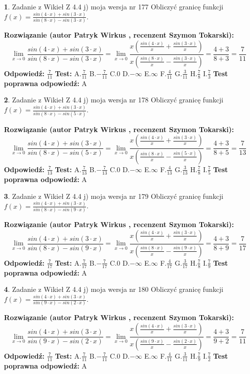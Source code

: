 \documentclass[12pt, a4paper]{article}
\theoremstyle{definition} %
\newtheorem{zad}{}
\newcommand{\zadStart}[1]{\begin{zad}#1\newline}
\newcommand{\zadStop}{\end{zad}}
\newcommand{\rozwStart}[2]{\noindent \textbf{Rozwiązanie (autor #1 , recenzent #2): }\newline}
\newcommand{\rozwStop}{\newline}
\newcommand{\odpStart}{\noindent \textbf{Odpowiedź:}\newline}
\newcommand{\odpStop}{\newline}
\newcommand{\testStart}{\noindent \textbf{Test:}\newline}
\newcommand{\testStop}{\newline}
\newcommand{\kluczStart}{\noindent \textbf{Test poprawna odpowiedź:}\newline}
\newcommand{\kluczStop}{\newline}
\begin{document}
\zadStart{Zadanie z Wikieł Z 4.4 j) moja wersja nr 177}
Obliczyć granicę funkcji $f(x)=\frac{sin(4\cdot x) +sin(3\cdot x)}{sin(8\cdot x) -sin(3\cdot x)}$.
\zadStop
\rozwStart{Patryk Wirkus}{Szymon Tokarski}
$$\lim\limits_{x\to 0}\frac{sin(4\cdot x) +sin(3\cdot x)}{sin(8\cdot x) -sin(3\cdot x)}=\lim\limits_{x\to 0}\frac{x(\frac{sin(4\cdot x)}{x}+\frac{sin(3\cdot x)}{x})}{x(\frac{sin(8\cdot x)}{x}-\frac{sin(3\cdot x)}{x})}=\frac{4+3}{8+3} = \frac{7}{11}$$
\rozwStop
\odpStart
$\frac{7}{11}$
\odpStop
\testStart
A.$\frac{7}{11}$
B.$-\frac{7}{11}$
C.$0$
D.$-\infty$
E.$\infty$
F.$\frac{4}{11}$
G.$\frac{3}{11}$
H.$\frac{7}{8}$
I.$\frac{7}{3}$
\testStop
\kluczStart
A
\kluczStop



\zadStart{Zadanie z Wikieł Z 4.4 j) moja wersja nr 178}
Obliczyć granicę funkcji $f(x)=\frac{sin(4\cdot x) +sin(3\cdot x)}{sin(8\cdot x) -sin(5\cdot x)}$.
\zadStop
\rozwStart{Patryk Wirkus}{Szymon Tokarski}
$$\lim\limits_{x\to 0}\frac{sin(4\cdot x) +sin(3\cdot x)}{sin(8\cdot x) -sin(5\cdot x)}=\lim\limits_{x\to 0}\frac{x(\frac{sin(4\cdot x)}{x}+\frac{sin(3\cdot x)}{x})}{x(\frac{sin(8\cdot x)}{x}-\frac{sin(5\cdot x)}{x})}=\frac{4+3}{8+5} = \frac{7}{13}$$
\rozwStop
\odpStart
$\frac{7}{13}$
\odpStop
\testStart
A.$\frac{7}{13}$
B.$-\frac{7}{13}$
C.$0$
D.$-\infty$
E.$\infty$
F.$\frac{4}{13}$
G.$\frac{3}{13}$
H.$\frac{7}{8}$
I.$\frac{7}{5}$
\testStop
\kluczStart
A
\kluczStop



\zadStart{Zadanie z Wikieł Z 4.4 j) moja wersja nr 179}
Obliczyć granicę funkcji $f(x)=\frac{sin(4\cdot x) +sin(3\cdot x)}{sin(8\cdot x) -sin(9\cdot x)}$.
\zadStop
\rozwStart{Patryk Wirkus}{Szymon Tokarski}
$$\lim\limits_{x\to 0}\frac{sin(4\cdot x) +sin(3\cdot x)}{sin(8\cdot x) -sin(9\cdot x)}=\lim\limits_{x\to 0}\frac{x(\frac{sin(4\cdot x)}{x}+\frac{sin(3\cdot x)}{x})}{x(\frac{sin(8\cdot x)}{x}-\frac{sin(9\cdot x)}{x})}=\frac{4+3}{8+9} = \frac{7}{17}$$
\rozwStop
\odpStart
$\frac{7}{17}$
\odpStop
\testStart
A.$\frac{7}{17}$
B.$-\frac{7}{17}$
C.$0$
D.$-\infty$
E.$\infty$
F.$\frac{4}{17}$
G.$\frac{3}{17}$
H.$\frac{7}{8}$
I.$\frac{7}{9}$
\testStop
\kluczStart
A
\kluczStop



\zadStart{Zadanie z Wikieł Z 4.4 j) moja wersja nr 180}
Obliczyć granicę funkcji $f(x)=\frac{sin(4\cdot x) +sin(3\cdot x)}{sin(9\cdot x) -sin(2\cdot x)}$.
\zadStop
\rozwStart{Patryk Wirkus}{Szymon Tokarski}
$$\lim\limits_{x\to 0}\frac{sin(4\cdot x) +sin(3\cdot x)}{sin(9\cdot x) -sin(2\cdot x)}=\lim\limits_{x\to 0}\frac{x(\frac{sin(4\cdot x)}{x}+\frac{sin(3\cdot x)}{x})}{x(\frac{sin(9\cdot x)}{x}-\frac{sin(2\cdot x)}{x})}=\frac{4+3}{9+2} = \frac{7}{11}$$
\rozwStop
\odpStart
$\frac{7}{11}$
\odpStop
\testStart
A.$\frac{7}{11}$
B.$-\frac{7}{11}$
C.$0$
D.$-\infty$
E.$\infty$
F.$\frac{4}{11}$
G.$\frac{3}{11}$
H.$\frac{7}{9}$
I.$\frac{7}{2}$
\testStop
\kluczStart
A
\kluczStop
\end{document}

